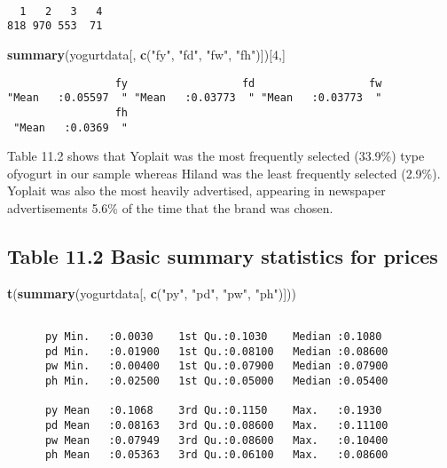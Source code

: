 \documentclass[]{book}
\newenvironment{Shaded}{\begin{snugshade}}{\end{snugshade}}
\newcommand{\DecValTok}[1]{\textcolor[rgb]{0.00,0.00,0.81}{#1}}
\newcommand{\KeywordTok}[1]{\textcolor[rgb]{0.13,0.29,0.53}{\textbf{#1}}}
\newcommand{\NormalTok}[1]{#1}
\newcommand{\StringTok}[1]{\textcolor[rgb]{0.31,0.60,0.02}{#1}}
\begin{document}
\begin{verbatim}

  1   2   3   4 
818 970 553  71 
\end{verbatim}

\begin{Shaded}
\begin{Highlighting}[]
\KeywordTok{summary}\NormalTok{(yogurtdata[, }\KeywordTok{c}\NormalTok{(}\StringTok{"fy"}\NormalTok{, }\StringTok{"fd"}\NormalTok{, }\StringTok{"fw"}\NormalTok{, }\StringTok{"fh"}\NormalTok{)])[}\DecValTok{4}\NormalTok{,]}
\end{Highlighting}
\end{Shaded}

\begin{verbatim}
                 fy                  fd                  fw 
"Mean   :0.05597  " "Mean   :0.03773  " "Mean   :0.03773  " 
                 fh 
 "Mean   :0.0369  " 
\end{verbatim}

Table 11.2 shows that Yoplait was the most frequently selected (33.9\%) type ofyogurt in our sample whereas Hiland was the least frequently selected (2.9\%). Yoplait was also the most heavily advertised, appearing in newspaper advertisements 5.6\% of the time that the brand was chosen.

\hypertarget{table-11.2-basic-summary-statistics-for-prices}{%
\subsection{Table 11.2 Basic summary statistics for prices}\label{table-11.2-basic-summary-statistics-for-prices}}

\begin{Shaded}
\begin{Highlighting}[]
\KeywordTok{t}\NormalTok{(}\KeywordTok{summary}\NormalTok{(yogurtdata[, }\KeywordTok{c}\NormalTok{(}\StringTok{"py"}\NormalTok{, }\StringTok{"pd"}\NormalTok{, }\StringTok{"pw"}\NormalTok{, }\StringTok{"ph"}\NormalTok{)])) }
\end{Highlighting}
\end{Shaded}

\begin{verbatim}
                                                              
      py Min.   :0.0030    1st Qu.:0.1030    Median :0.1080   
      pd Min.   :0.01900   1st Qu.:0.08100   Median :0.08600  
      pw Min.   :0.00400   1st Qu.:0.07900   Median :0.07900  
      ph Min.   :0.02500   1st Qu.:0.05000   Median :0.05400  
                                                              
      py Mean   :0.1068    3rd Qu.:0.1150    Max.   :0.1930   
      pd Mean   :0.08163   3rd Qu.:0.08600   Max.   :0.11100  
      pw Mean   :0.07949   3rd Qu.:0.08600   Max.   :0.10400  
      ph Mean   :0.05363   3rd Qu.:0.06100   Max.   :0.08600  
\end{verbatim}
\end{document}
